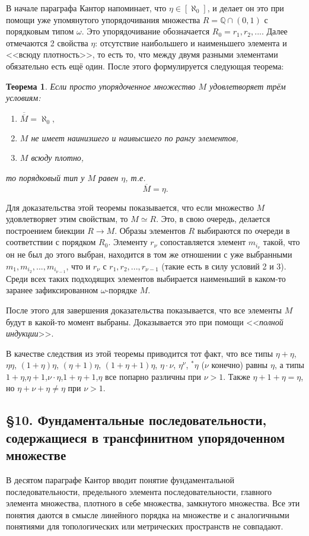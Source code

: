 \documentclass[a4paper,12pt]{extarticle}
\newtheorem{theorem}{Теорема}[subsection]
\theoremstyle{definition}
\newcommand{\cit}[1]{<<\textit{#1}>>}
\newcommand{\car}[1]{\overline{\overline{#1}}}
\begin{document}
В начале параграфа Кантор напоминает, что $\eta \in [\aleph_0]$, и делает он это при помощи
уже упомянутого упорядочивания множества $R = \mathbb{Q} \cap (0,1)$ с порядковым типом $\omega$.
Это упорядочивание обозначается $R_0 = {r_1, r_2, ...}$.
Далее отмечаются 2 свойства $\eta$: отсутствие наибольшего и наименьшего элемента и <<всюду плотность>>, то есть то, что между двумя разными элементами обязательно есть ещё один.
После этого формулируется следующая теорема:
\begin{theorem}
    Если просто упорядоченное множество $M$ удовлетворяет трём условиям:
    \begin{enumerate}
        \item $\car{M} = \aleph_0,$
        \item $M$ не имеет наинизшего и наивысшего по рангу элементов,
        \item $M$ всюду плотно,
    \end{enumerate}
    то порядковый тип у $M$ равен $\eta$, т.е. $$\overline{M} = \eta.$$
\end{theorem}
Для доказательства этой теоремы показывается, что если множество $M$ удовлетворяет этим свойствам, то $M \simeq R$.
Это, в свою очередь, делается построением биекции $R \rightarrow M$.
Образы элементов $R$ выбираются по очереди в соответствии с порядком $R_0$.
Элементу $r_\nu$ сопоставляется элемент $m_{i_\nu}$ такой, что он не был до этого выбран,
находится в том же отношении с уже выбранными $m_1, m_{i_2}, ..., m_{i_{\nu - 1}}$, что и $r_\nu$ с $r_1, r_2, ..., r_{\nu - 1}$ (такие есть в силу условий 2 и 3).
Среди всех таких подходящих элементов выбирается наименьший в каком-то заранее зафиксированном $\omega$-порядке $M$.

После этого для завершения доказательства показывается, что все элементы $M$ будут в какой-то момент выбраны.
Доказывается это при помощи \cit{полной индукции}.

В качестве следствия из этой теоремы приводится тот факт, что все типы $\eta + \eta$, $\eta\eta$, $(1 + \eta)\eta$, $(\eta + 1)\eta$, $(1 + \eta + 1)\eta$, $\eta \cdot \nu$, $\eta^{\nu}$, $^*\eta$ ($\nu$ конечно) равны $\eta$,
а типы $1 + \eta$,$ \eta + 1$,$ \nu \cdot \eta$,$ 1 + \eta + 1$,$ \eta$ все попарно различны при $\nu > 1$.
Также $\eta + 1 + \eta = \eta$, но $\eta + \nu + \eta \neq \eta$ при $\nu > 1$.

\subsection{\S 10. Фундаментальные последовательности, содержащиеся в трансфинитном упорядоченном множестве}
В десятом параграфе Кантор вводит понятие фундаментальной последовательности, предельного элемента последовательности,
главного элемента множества, плотного в себе множества, замкнутого множества.
Все эти понятия даются в смысле линейного порядка на множестве и с аналогичными понятиями для топологических или метрических пространств не совпадают.
\end{document}
